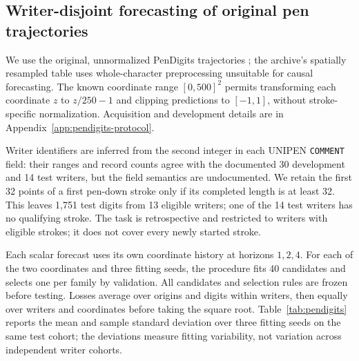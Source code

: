 \subsection{Writer-disjoint forecasting of original pen trajectories}
\label{sec:pendigits}

We use the original, unnormalized PenDigits trajectories
\citep{alpaydin1996pendigits}; the archive's spatially resampled table uses
whole-character preprocessing unsuitable for causal forecasting. The known
coordinate range $[0,500]^2$ permits transforming each coordinate $z$ to
$z/250-1$ and clipping predictions to $[-1,1]$, without stroke-specific normalization.
Acquisition and development details are in Appendix~\ref{app:pendigits-protocol}.

Writer identifiers are inferred from the second integer in each UNIPEN
\texttt{COMMENT} field: their ranges and record counts agree with the
documented 30 development and 14 test writers, but the field semantics are
undocumented. We retain the first 32 points of a first pen-down stroke only
if its completed length is at least 32. This leaves 1,751 test digits from
13 eligible writers; one of the 14 test writers has no qualifying stroke.
The task is retrospective and restricted to writers with eligible strokes;
it does not cover every newly started stroke.

Each scalar forecast uses its own coordinate history at horizons $1,2,4$.
For each of the two coordinates and three fitting seeds, the procedure fits
40 candidates and selects one per family by validation. All candidates and
selection rules are frozen before testing. Losses average over origins and
digits within writers, then equally over writers and coordinates before
taking the square root. Table~\ref{tab:pendigits} reports the mean and sample
standard deviation over three fitting seeds on the same test cohort;
the deviations measure fitting variability, not variation across independent
writer cohorts.

\begin{table}[t]
  \centering
  \small
  \setlength{\tabcolsep}{3pt}
  
  \caption{Original PenDigits forecasting on 1,751 eligible digits from
  13 held-out writers. Coordinate-pooled test RMSE is mean $\pm$ sample
  standard deviation over three fitting seeds. ``Features'' is the mean
  retained count for validation-selected models. Each scalar forecast uses
  only its own coordinate's history; all selections precede test scoring.}
  \label{tab:pendigits}
\end{table}

